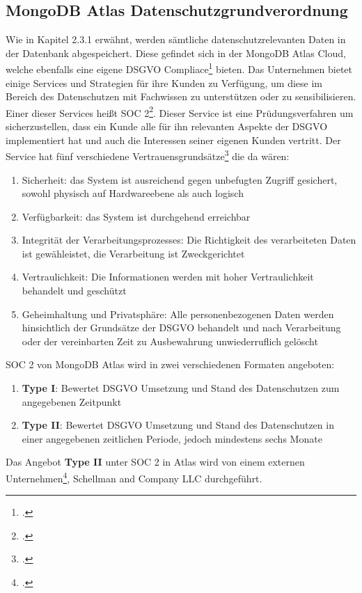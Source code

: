\subsection{MongoDB Atlas Datenschutzgrundverordnung}
Wie in Kapitel 2.3.1 erwähnt, werden sämtliche datenschutzrelevanten Daten in der Datenbank abgespeichert. Diese gefindet sich in der MongoDB Atlas Cloud, welche ebenfalls eine eigene DSGVO Compliace\footcite{atlas-dsgvo-com} bieten.
Das Unternehmen bietet einige Services und Strategien für ihre Kunden zu Verfügung, um diese im Bereich des Datenschutzen mit Fachwissen zu unterstützen oder zu sensibilisieren. Einer dieser Services heißt SOC 2\footcite{atlas-soc2}.
Dieser Service ist eine Prüdungsverfahren um sicherzustellen, dass ein Kunde alle für ihn relevanten Aspekte der DSGVO implementiert hat und auch die Interessen seiner eigenen Kunden vertritt. Der Service hat fünf verschiedene
Vertrauensgrundsätze\footcite{atlas-soc2} die da wären:

\begin{enumerate}
	\item Sicherheit: das System ist ausreichend gegen unbefugten Zugriff gesichert, sowohl physisch auf Hardwareebene als auch logisch
	\item Verfügbarkeit: das System ist durchgehend erreichbar
	\item Integrität der Verarbeitungsprozesses: Die Richtigkeit des verarbeiteten Daten ist gewähleistet, die Verarbeitung ist Zweckgerichtet
	\item Vertraulichkeit: Die Informationen werden mit hoher Vertraulichkeit behandelt und geschützt
	\item Geheimhaltung und Privatsphäre: Alle personenbezogenen Daten werden hinsichtlich der Grundsätze der DSGVO behandelt und nach Verarbeitung oder der vereinbarten Zeit zu Ausbewahrung unwiederruflich gelöscht
\end{enumerate}

SOC 2 von MongoDB Atlas wird in zwei verschiedenen Formaten angeboten:

\begin{enumerate}
	\item \textbf{Type I}: Bewertet DSGVO Umsetzung und Stand des Datenschutzen zum angegebenen Zeitpunkt 
	\item \textbf{Type II}: Bewertet DSGVO Umsetzung und Stand des Datenschutzen in einer angegebenen zeitlichen Periode, jedoch mindestens sechs Monate
\end{enumerate}

Das Angebot \textbf{Type II} unter SOC 2 in Atlas wird von einem externen Unternehmen\footcite{atlas-soc2}, Schellman and Company LLC durchgeführt.
\newpage